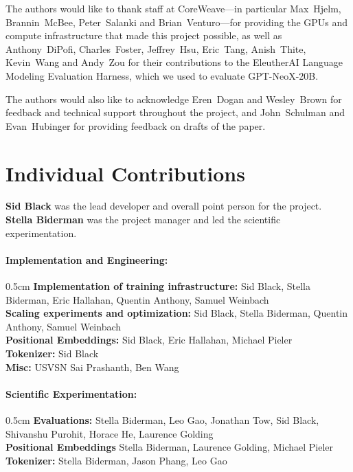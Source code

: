 \documentclass{article}
\newcommand{\model}{GPT-NeoX-20B}
\begin{document}
The authors would like to thank staff at CoreWeave---in particular Max~Hjelm, Brannin~McBee, Peter~Salanki and Brian~Venturo---for providing the GPUs and compute infrastructure that made this project possible, as well as Anthony~DiPofi, Charles~Foster, Jeffrey~Hsu, Eric~Tang, Anish~Thite, Kevin~Wang and Andy~Zou for their contributions to the EleutherAI Language Modeling Evaluation Harness, which we used to evaluate \model{}. 

The authors would also like to acknowledge Eren~Dogan and Wesley~Brown for feedback and technical support throughout the project, and John~Schulman and Evan~Hubinger for providing feedback on drafts of the paper.




\appendix

\section{Individual Contributions}\label{app:contrib}

\textbf{Sid Black} was the lead developer and overall point person for the project. \textbf{Stella Biderman} was the project manager and led the scientific experimentation.


\paragraph{Implementation and Engineering:}
\begin{adjustwidth}{0.5cm}{}
\textbf{Implementation of training infrastructure:} Sid Black, Stella Biderman, Eric Hallahan, Quentin Anthony, Samuel Weinbach\\
\textbf{Scaling experiments and optimization:} Sid Black, Stella Biderman, Quentin Anthony, Samuel Weinbach\\
\textbf{Positional Embeddings:} Sid Black, Eric Hallahan, Michael Pieler\\
\textbf{Tokenizer:} Sid Black\\
\textbf{Misc:} USVSN Sai Prashanth, Ben Wang\\
\end{adjustwidth}

\paragraph{Scientific Experimentation:}
\begin{adjustwidth}{0.5cm}{}
\textbf{Evaluations:} Stella Biderman, Leo Gao, Jonathan Tow, Sid Black, Shivanshu Purohit, Horace He, Laurence Golding\\
\textbf{Positional Embeddings} Stella Biderman, Laurence Golding, Michael Pieler\\
\textbf{Tokenizer:} Stella Biderman, Jason Phang, Leo Gao\\
\end{adjustwidth}
\end{document}
